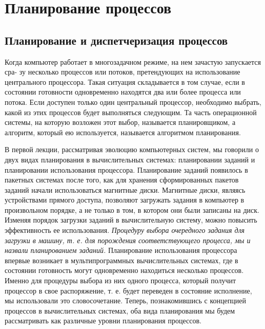 \newpage
\section{Планирование процессов}

\subsection{Планирование и диспетчеризация процессов}

Когда компьютер работает в многозадачном режиме, на нем зачастую запускается сра-
зу несколько процессов или потоков, претендующих на использование центрального
процессора. Такая ситуация складывается в том случае, если в состоянии готовности
одновременно находятся два или более процесса или потока. Если доступен только
один центральный процессор, необходимо выбрать, какой из этих процессов будет
выполняться следующим. Та часть операционной системы, на которую возложен этот
выбор, называется планировщиком, а алгоритм, который ею используется, называется
алгоритмом планирования.

В первой лекции, рассматривая эволюцию компьютерных систем, мы говорили о двух видах планирования в вычислительных системах: планировании заданий и планировании использования процессора. Планирование заданий появилось в пакетных системах после того, как для хранения сформированных пакетов заданий начали использоваться магнитные диски. Магнитные диски, являясь устройствами прямого доступа, позволяют загружать задания в компьютер в произвольном порядке, а не только в том, в котором они были записаны на диск. Изменяя порядок загрузки заданий в вычислительную систему, можно повысить эффективность ее использования. \textit{Процедуру выбора очередного задания для загрузки в машину, т. е. для порождения соответствующего процесса, мы и назвали планированием заданий.} Планирование использования процессора впервые возникает в мультипрограммных вычислительных системах, где в состоянии готовность могут одновременно находиться несколько процессов. Именно для процедуры выбора из них одного процесса, который получит процессор в свое распоряжение, т. е. будет переведен в состояние исполнение, мы использовали это словосочетание. Теперь, познакомившись с концепцией процессов в вычислительных системах, оба вида планирования мы будем рассматривать как различные уровни планирования процессов.

